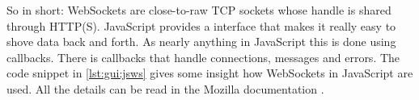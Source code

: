 So in  short: WebSockets are close-to-raw  TCP sockets whose handle  is shared
through HTTP(S).
JavaScript provides a  interface that makes it really easy  to shove data back
and forth.
As  nearly anything  in  JavaScript  this is  done  using callbacks. There  is
callbacks that  handle connections, messages  and errors. The code  snippet in
\ref{lst:gui:jsws}  gives  some  insight  how  WebSockets  in  JavaScript  are
used. All the details can be read in the Mozilla documentation \cite{moz:ws}.



